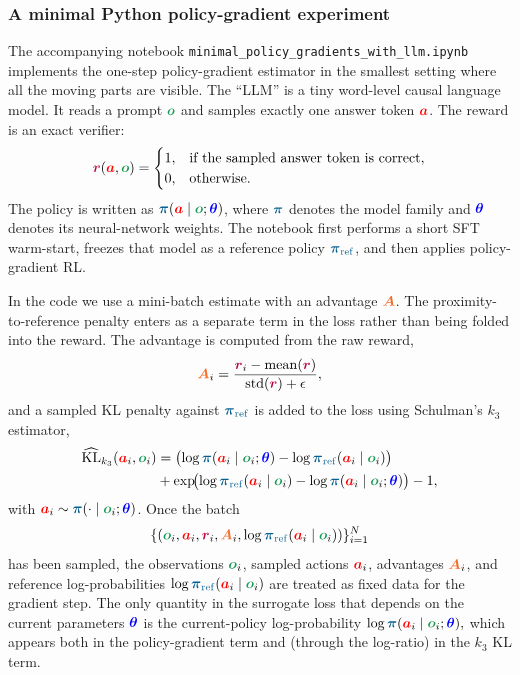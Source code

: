 \documentclass{article}
\newcommand{\colsym}[2]{\ensuremath{\textcolor{#1}{\boldsymbol{#2}}}}
\newcommand{\action}{\colsym{red}{a}}
\newcommand{\obs}{\colsym{ForestGreen}{o}}
\newcommand{\reward}{\colsym{purple}{r}}
\newcommand{\params}{\colsym{blue}{\theta}}
\newcommand{\policy}{\colsym{MidnightBlue}{\pi}}
\newcommand{\advantage}{\colsym{Orange}{A}}
\newcommand{\refpolicy}{\ensuremath{\textcolor{MidnightBlue}{\boldsymbol{\pi}_{\mathrm{ref}}}}}
\begin{document}
\subsubsection{A minimal Python policy-gradient experiment}
\label{sec:minimal_pg_code}

The accompanying notebook \texttt{minimal\_policy\_gradients\_with\_llm.ipynb} implements the one-step policy-gradient estimator in the smallest setting where all the moving parts are visible. The ``LLM'' is a tiny word-level causal language model. It reads a prompt \obs{} and samples exactly one answer token \action. The reward is an exact verifier:
\[
\reward(\action,\obs)
=
\begin{cases}
1, & \text{if the sampled answer token is correct},\\
0, & \text{otherwise}.
\end{cases}
\]
The policy is written as \(\policy(\action\mid\obs;\params)\), where \policy{} denotes the model family and \params{} denotes its neural-network weights. The notebook first performs a short SFT warm-start, freezes that model as a reference policy \refpolicy, and then applies policy-gradient RL.

In the code we use a mini-batch estimate with an advantage \advantage. The proximity-to-reference penalty enters as a separate term in the loss rather than being folded into the reward. The advantage is computed from the raw reward,
\[
\advantage_i
=
\frac{\reward_i-\operatorname{mean}(\reward)}
{\operatorname{std}(\reward)+\epsilon},
\]
and a sampled KL penalty against \refpolicy{} is added to the loss using Schulman's $k_{3}$ estimator,
\begin{align*}
\widehat{\mathrm{KL}}_{k_{3}}(\action_i,\obs_i) 
&=
\bigl(\log \policy(\action_i\mid\obs_i;\params)-\log \refpolicy(\action_i\mid\obs_i)\bigr)\\
&+\exp\!\bigl(\log \refpolicy(\action_i\mid\obs_i)-\log \policy(\action_i\mid\obs_i;\params)\bigr)
-1,
\end{align*}
with \(\action_i\sim\policy(\cdot\mid\obs_i;\params)\). Once the batch
\[
\{(\obs_i,\action_i,\reward_i,\advantage_i,\log\refpolicy(\action_i\mid\obs_i))\}_{i=1}^{N}
\]
has been sampled, the observations \(\obs_i\), sampled actions \(\action_i\), advantages \(\advantage_i\), and reference log-probabilities \(\log\refpolicy(\action_i\mid\obs_i)\) are treated as fixed data for the gradient step. The only quantity in the surrogate loss that depends on the current parameters \(\params\) is the current-policy log-probability
$\log \policy(\action_i\mid \obs_i;\params),$
which appears both in the policy-gradient term and (through the log-ratio) in the $k_{3}$ KL term.
\end{document}
